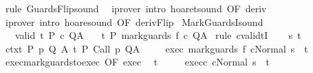 \begin{isabellebody}
\isamarkupfalse%
\ {\isacharparenleft}rule\ GuardsFlip{\isacharunderscore}sound{\isacharparenright}\isanewline
{}\isamarkupfalse%
\ \ {\isacharparenleft}iprover\ intro{\isacharcolon}\ hoaret{\isacharunderscore}sound\ {\isacharbrackleft}OF\ deriv{\isacharbrackright}{\isacharparenright}\isanewline
{}\isamarkupfalse%
\ {\isacharparenleft}iprover\ intro{\isacharcolon}\ hoare{\isacharunderscore}sound\ {\isacharbrackleft}OF\ derivFlip{\isacharbrackright}{\isacharparenright}\isanewline
{}\isamarkupfalse%
%
\endisatagproof
{\isafoldproof}%
%
\isadelimproof
\isanewline
%
\endisadelimproof
\isanewline
{}\isamarkupfalse%
\ MarkGuardsI{\isacharunderscore}sound{\isacharcolon}\ \isanewline
\ \ \ valid{\isacharcolon}\ {\isachardoublequoteopen}{\isasymGamma}{\isacharcomma}{\isasymTheta}{\isasymTurnstile}\isactrlsub t\isactrlbsub {\isacharslash}{\isacharbraceleft}{\isacharbraceright}\isactrlesub \ P\ c\ Q{\isacharcomma}A{\isachardoublequoteclose}\isanewline
\ \ \ {\isachardoublequoteopen}{\isasymGamma}{\isacharcomma}{\isasymTheta}{\isasymTurnstile}\isactrlsub t\isactrlbsub {\isacharslash}{\isacharbraceleft}{\isacharbraceright}\isactrlesub \ P\ mark{\isacharunderscore}guards\ f\ c\ Q{\isacharcomma}A{\isachardoublequoteclose}\isanewline
%
\isadelimproof
%
\endisadelimproof
%
\isatagproof
{}\isamarkupfalse%
\ {\isacharparenleft}rule\ cvalidtI{\isacharparenright}\isanewline
\ \ \isamarkupfalse%
\ s\ t\isanewline
\ \ \isamarkupfalse%
\ ctxt{\isacharcolon}\ {\isachardoublequoteopen}{\isasymforall}{\isacharparenleft}P{\isacharcomma}\ p{\isacharcomma}\ Q{\isacharcomma}\ A{\isacharparenright}{\isasymin}{\isasymTheta}{\isachardot}\ {\isasymGamma}{\isasymTurnstile}\isactrlsub t\isactrlbsub {\isacharslash}{\isacharbraceleft}{\isacharbraceright}\isactrlesub \ P\ {\isacharparenleft}Call\ p{\isacharparenright}\ Q{\isacharcomma}A{\isachardoublequoteclose}\ \isanewline
\ \ \isamarkupfalse%
\ exec{\isacharcolon}\ {\isachardoublequoteopen}{\isasymGamma}{\isasymturnstile}{\isasymlangle}mark{\isacharunderscore}guards\ f\ c{\isacharcomma}Normal\ s{\isasymrangle}\ {\isasymRightarrow}\ t{\isachardoublequoteclose}\ \isanewline
\ \ \isamarkupfalse%
\ exec{\isacharunderscore}mark{\isacharunderscore}guards{\isacharunderscore}to{\isacharunderscore}exec\ {\isacharbrackleft}OF\ exec{\isacharbrackright}\ \isamarkupfalse%
\ t{\isacharprime}\ \isanewline
\ \ \ \ exec{\isacharunderscore}c{\isacharcolon}\ {\isachardoublequoteopen}{\isasymGamma}{\isasymturnstile}{\isasymlangle}c{\isacharcomma}Normal\ s{\isasymrangle}\ {\isasymRightarrow}\ t{\isacharprime}{\isachardoublequoteclose}\ \isanewline

\end{isabellebody}
